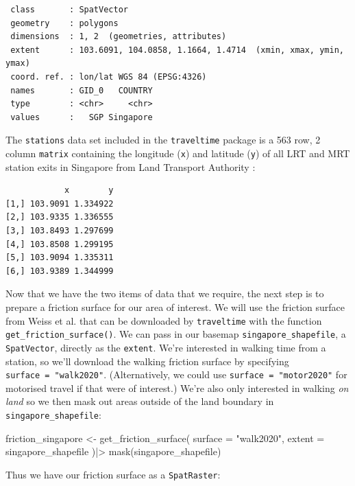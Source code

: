\documentclass[
  10pt,
  letterpaper,
]{article}
\newenvironment{Shaded}{\begin{snugshade}}{\end{snugshade}}
\newcommand{\AttributeTok}[1]{\textcolor[rgb]{0.40,0.45,0.13}{#1}}
\newcommand{\FunctionTok}[1]{\textcolor[rgb]{0.28,0.35,0.67}{#1}}
\newcommand{\NormalTok}[1]{\textcolor[rgb]{0.00,0.23,0.31}{#1}}
\newcommand{\OtherTok}[1]{\textcolor[rgb]{0.00,0.23,0.31}{#1}}
\newcommand{\SpecialCharTok}[1]{\textcolor[rgb]{0.37,0.37,0.37}{#1}}
\newcommand{\StringTok}[1]{\textcolor[rgb]{0.13,0.47,0.30}{#1}}
\begin{document}
\begin{verbatim}
 class       : SpatVector 
 geometry    : polygons 
 dimensions  : 1, 2  (geometries, attributes)
 extent      : 103.6091, 104.0858, 1.1664, 1.4714  (xmin, xmax, ymin, ymax)
 coord. ref. : lon/lat WGS 84 (EPSG:4326) 
 names       : GID_0   COUNTRY
 type        : <chr>     <chr>
 values      :   SGP Singapore
\end{verbatim}

The \texttt{stations} data set included in the \texttt{traveltime}
package is a 563 row, 2 column \texttt{matrix} containing the longitude
(\texttt{x}) and latitude (\texttt{y}) of all LRT and MRT station exits
in Singapore from Land Transport Authority \citet{singdata}:

\begin{verbatim}
            x        y
[1,] 103.9091 1.334922
[2,] 103.9335 1.336555
[3,] 103.8493 1.297699
[4,] 103.8508 1.299195
[5,] 103.9094 1.335311
[6,] 103.9389 1.344999
\end{verbatim}

Now that we have the two items of data that we require, the next step is
to prepare a friction surface for our area of interest. We will use the
friction surface from Weiss et al. \citep{weiss2020global} that can be
downloaded by \texttt{traveltime} with the function
\texttt{get\_friction\_surface()}. We can pass in our basemap
\texttt{singapore\_shapefile}, a \texttt{SpatVector}, directly as the
\texttt{extent}. We're interested in walking time from a station, so
we'll download the walking friction surface by specifying
\texttt{surface\ =\ "walk2020"}. (Alternatively, we could use
\texttt{surface\ =\ "motor2020"} for motorised travel if that were of
interest.) We're also only interested in walking \emph{on land} so we
then mask out areas outside of the land boundary in
\texttt{singapore\_shapefile}:

\begin{Shaded}
\begin{Highlighting}[]
\NormalTok{friction\_singapore }\OtherTok{\textless{}{-}} \FunctionTok{get\_friction\_surface}\NormalTok{(}
    \AttributeTok{surface =} \StringTok{"walk2020"}\NormalTok{,}
    \AttributeTok{extent =}\NormalTok{ singapore\_shapefile}
\NormalTok{  )}\SpecialCharTok{|\textgreater{}} 
  \FunctionTok{mask}\NormalTok{(singapore\_shapefile)}
\end{Highlighting}
\end{Shaded}

Thus we have our friction surface as a \texttt{SpatRaster}:
\end{document}
